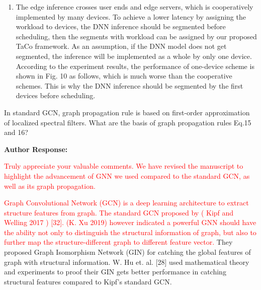 \documentclass{ar2rc}
\begin{document}
\begin{enumerate}
	\item The edge inference crosses user ends and edge servers, which is cooperatively implemented by many devices. To achieve a lower latency by assigning the workload to devices, the DNN inference should be segmented before scheduling, then the segments with workload can be assigned by our proposed TaCo framework. As an assumption, if the DNN model does not get segmented, the inference will be implemented as a whole by only one device. According to the experiment results, the performance of one-device scheme is shown in Fig. 10 as follows, which is much worse than the cooperative schemes. This is why the DNN inference should be segmented by the first devices before scheduling.

\end{enumerate}

\begin{tcolorbox}[
   title={Reviewer 2: Comment 5},
   colback=gray!10,%
   colframe=black,%
   width=\linewidth,%
   arc=1mm, auto outer arc,
   boxrule=0.5pt,
]
In standard GCN, graph propagation rule is based on first-order approximation of localized spectral filters. What are the basis of graph propagation rules Eq.15 and 16?
\end{tcolorbox}

\textbf{Author Response:}

\textcolor{red}{Truly appreciate your valuable comments. We have revised the manuscript to highlight the advancement of GNN we used compared to the standard GCN, as well as its graph propagation.}

\textcolor{red}{Graph Convolutional Network (GCN) is a deep learning architecture to extract structure features from graph. The standard GCN proposed by ( Kipf and Welling 2017 ) [32]. (K. Xu 2019) however indicated a powerful GNN should have the ability not only to distinguish the structural information of graph, but also to further map the structure-different graph to different feature vector.} They proposed Graph Isomorphism Network (GIN) for catching the global features of graph with structural information. W. Hu et. al. [28] used mathematical theory and experiments to proof their GIN gets better performance in catching structural features compared to Kipf's standard GCN. 
\end{document}

